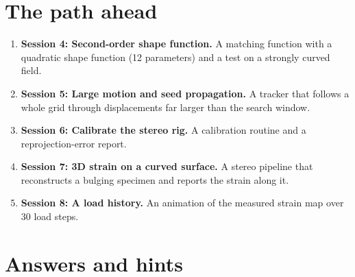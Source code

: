 \documentclass[11pt,a4paper]{article}
\begin{document}
\section{The path ahead}
\begin{enumerate}[nosep]
\item \textbf{Session 4: Second-order shape function.} A matching function with a quadratic shape function (12 parameters) and a test on a strongly curved field.
\item \textbf{Session 5: Large motion and seed propagation.} A tracker that follows a whole grid through displacements far larger than the search window.
\item \textbf{Session 6: Calibrate the stereo rig.} A calibration routine and a reprojection-error report.
\item \textbf{Session 7: 3D strain on a curved surface.} A stereo pipeline that reconstructs a bulging specimen and reports the strain along it.
\item \textbf{Session 8: A load history.} An animation of the measured strain map over 30 load steps.
\end{enumerate}

\section{Answers and hints}
\end{document}
